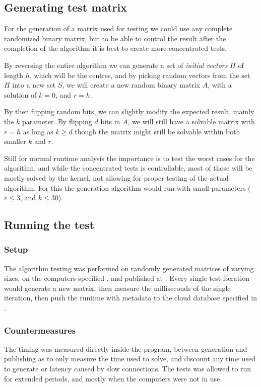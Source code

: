 \documentclass[a4paper]{article}
\begin{document}
\subsection{Generating test matrix}
For the generation of a matrix used for testing we could use any complete randomized binary
matrix, but to be able to control the result after the completion of the algorithm it is best
to create more concentrated tests.

By reversing the entire algorithm we can generate a set of \textit{initial vectors} $H$ of length $h$,
which will be the centres, and by picking random vectors from the set $H$ into a new set $S$,
we will create a new random binary matrix $A$, with a solution of $k=0$, and $r=h$.

By then flipping random bits, we can slightly modify the expected result, mainly
the $k$ parameter. By flipping $d$ bits in $A$, we will still have a solvable matrix
with $r = h$ as long as $k \geq d$ though the matrix might still be solvable within both
smaller $k$ and $r$.



Still for normal runtime analysis the importance is to test the worst cases for the algorithm,
and while the concentrated tests is controllable, most of those will be mostly solved by the
kernel, not allowing for proper testing of the actual algorithm. For this the generation
algorithm would run with small parameters ($r \leq 3$, and $k \leq 30$).

\subsection{Running the test}
\subsubsection{Setup}
The algorithm testing was performed on randomly generated matrices of varying sizes, on the computers
specified , and published at \cite{datastudio_results}.
Every single test iteration would generate a new matrix, then measure the
milliseconds of the single iteration, then push the runtime with metadata to the cloud database specified
in .

\subsubsection{Countermeasures}
The timing was measured directly inside the program, between generation and publishing as to only measure
the time used to solve, and discount any time used to generate or latency caused by slow connections. The tests
was allowed to run for extended periods, and mostly when the computers were not in use.
\end{document}
